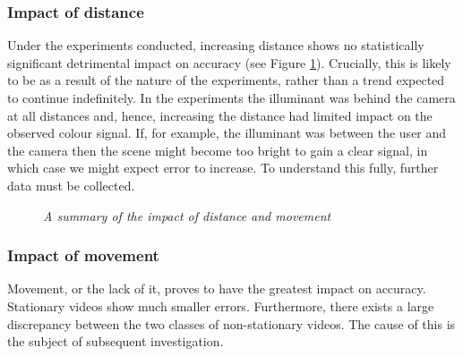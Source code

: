 \subsubsection{Impact of distance}
Under the experiments conducted, increasing distance shows no statistically significant detrimental impact on accuracy (see Figure \ref{fig:dist_and_move}).
Crucially, this is likely to be as a result of the nature of the experiments, rather than a trend expected to continue indefinitely.
In the experiments the illuminant was behind the camera at all distances and, hence, increasing the distance had limited impact on the observed colour signal.
If, for example, the illuminant was between the user and the camera then the scene might become too bright to gain a clear signal, in which case we might expect error to increase.
To understand this fully, further data must be collected.
\begin{figure}[H]
    \centering
    \quad
    \quad
    \caption{\textit{A summary of the impact of distance and movement}}
    \label{fig:dist_and_move}
\end{figure}

\subsubsection{Impact of movement}
Movement, or the lack of it, proves to have the greatest impact on accuracy. Stationary videos show much smaller errors. Furthermore, there exists a large discrepancy between the two classes of non-stationary videos. The cause of this is the subject of subsequent investigation.


